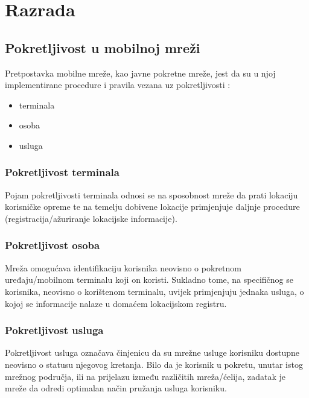 \documentclass[zavrsnirad]{fer}
\begin{document}
\chapter{Razrada}
\label{pog:razrada}

\section{Pokretljivost u mobilnoj mreži}
\label{dio:pokretljivost}

Pretpostavka mobilne mreže, kao javne pokretne mreže, jest da su u njoj implementirane
procedure i pravila vezana uz pokretljivosti \cite{JPM-2023-24-01n}:

\begin{itemize}
  \itemsep-0.5em
  \item terminala
  \item osoba
  \item usluga
\end{itemize}

\subsection{Pokretljivost terminala}
\label{poddio:pokretljivost_terminala}

Pojam pokretljivosti terminala odnosi se na sposobnost mreže da prati lokaciju korisničke opreme
te na temelju dobivene lokacije primjenjuje daljnje procedure (registracija/ažuriranje lokacijske informacije).

\subsection{Pokretljivost osoba}
\label{poddio:pokretljivost_osoba}

Mreža omogućava identifikaciju korisnika neovisno o pokretnom uređaju/mobilnom terminalu koji on koristi. Sukladno tome,
na specifičnog se korisnika, neovisno o korištenom terminalu, uvijek primjenjuju jednaka usluga, o kojoj se informacije
nalaze u domaćem lokacijskom registru. 

\subsection{Pokretljivost usluga}
\label{poddio:pokretljivost_usluga}

Pokretljivost usluga označava činjenicu da su mrežne usluge korisniku dostupne neovisno o statusu
njegovog kretanja. Bilo da je korisnik u pokretu, unutar istog mrežnog područja, ili na prijelazu između
različitih mreža/ćelija, zadatak je mreže da odredi optimalan način pružanja usluga korisniku.
\end{document}
